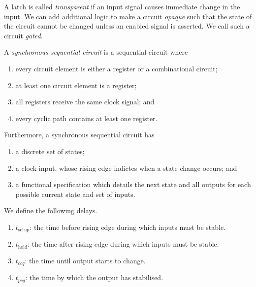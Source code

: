 A latch is called \emph{transparent} if an input signal causes
immediate change in the input. 
We can add additional logic to make a circuit \emph{opaque} such that
the state of the circuit cannot be changed unless an enabled signal is
asserted.
We call such a circuit \emph{gated}.

\begin{definition}
	A \emph{synchronous sequential circuit} is a sequential circuit
	where
	\begin{enumerate}
		\item every circuit element is either a register or a
			combinational circuit;
		\item at least one circuit element is a register;
		\item all registers receive the same clock signal; and
		\item every cyclic path contains at least one register.
	\end{enumerate}
	Furthermore, a synchronous sequential circuit has
	\begin{enumerate}
		\item a discrete set of states;
		\item a clock input, whose rising edge indictes when a state change
			occurs; and
		\item a functional specification which details the next state and
			all outputs for each possible current state and set of inputs.
	\end{enumerate}
\end{definition}

We define the following delays.

\begin{enumerate}
	\item $t_\text{setup}$: the time before rising edge during which inputs must
		be stable.
	\item $t_\text{hold}$: the time after rising edge during which inputs must
		be stable.
	\item $t_{ccq}$: the time until output starts to change.
	\item $t_{pcq}$: the time by which the output has stabilised.
\end{enumerate}